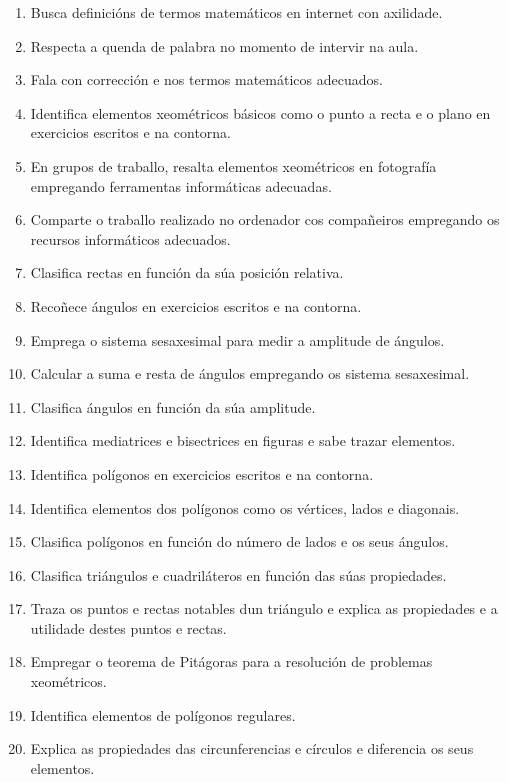 \begin{enumerate}[label=\bfseries Est\arabic*, align=left, leftmargin=1.5cm]
    \item\label{est:definicions} Busca definicións de termos matemáticos en internet con axilidade.
    \item\label{est:turnopalabra} Respecta a quenda de palabra no momento de intervir na aula.
    \item\label{est:falacorrecion} Fala con corrección e nos termos matemáticos adecuados.
    \item\label{est:puntorecta} Identifica elementos xeométricos básicos como o punto a recta e o plano en exercicios escritos e na contorna.
    \item\label{est:resaltar} En grupos de traballo, resalta elementos xeométricos en fotografía empregando ferramentas informáticas adecuadas.
    \item\label{est:compartir} Comparte o traballo realizado no ordenador cos compañeiros empregando os recursos informáticos adecuados.
    \item\label{est:posrectas} Clasifica rectas en función da súa posición relativa.
    \item\label{est:angulos} Recoñece ángulos en exercicios escritos e na contorna.
    \item\label{est:sexasesimal} Emprega o sistema sesaxesimal para medir a amplitude de ángulos.
    \item\label{est:sumarestaangulos} Calcular a suma e resta de ángulos empregando os sistema sesaxesimal.
    \item\label{est:clasangulos} Clasifica ángulos en función da súa amplitude.
    \item\label{est:mediatriz} Identifica mediatrices e bisectrices en figuras e sabe trazar elementos.
    \item\label{est:poligonos} Identifica polígonos en exercicios escritos e na contorna.
    \item\label{est:elementospoligonos} Identifica elementos dos polígonos como os vértices, lados e diagonais.
    \item\label{est:claspoligolados} Clasifica polígonos en función do número de lados e os seus ángulos.
    \item\label{est:claspoligonos} Clasifica triángulos e cuadriláteros en función das súas propiedades.
    \item\label{est:puntosnotables} Traza os puntos e rectas notables dun triángulo e explica as propiedades e a utilidade destes puntos e rectas.
    \item\label{est:pitagoras} Empregar o teorema de Pitágoras para a resolución de problemas xeométricos.
    \item\label{est:elementosregulares} Identifica elementos de polígonos regulares.
    \item\label{est:circunferencia} Explica as propiedades das circunferencias e círculos e diferencia os seus elementos.
  \end{enumerate}

